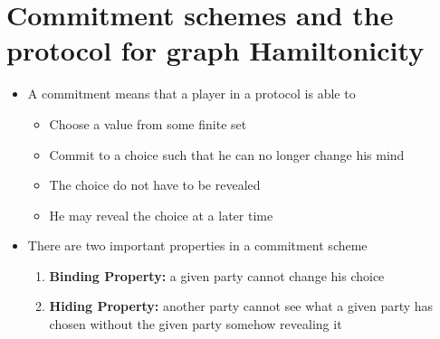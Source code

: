 \section{Commitment schemes and the protocol for graph Hamiltonicity}
\begin{itemize}
	\item A commitment means that a player in a protocol is able to
  \begin{itemize}
	  \item Choose a value from some finite set
  	\item Commit to a choice such that he can no longer change his mind
  	\item The choice do not have to be revealed
		\item He may reveal the choice at a later time
  \end{itemize}
  \item There are two important properties in a commitment scheme
  \begin{enumerate}
  	\item \textbf{Binding Property:} a given party cannot change his choice
  	\item \textbf{Hiding Property:} another party cannot see what a given party has chosen without the given party somehow revealing it
  \end{enumerate}
\end{itemize}

